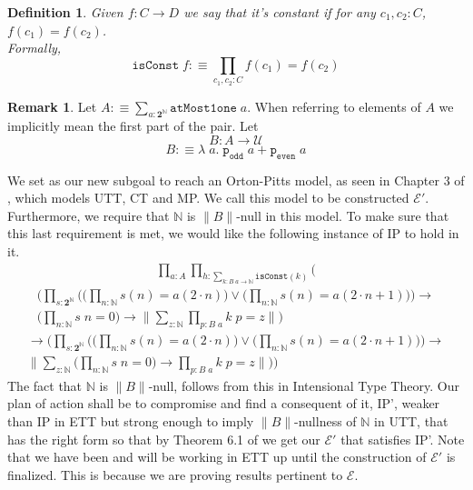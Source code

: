 \documentclass[12pt]{report}
\newtheorem{defn}[thm]{Definition}
\theoremstyle{definition}
\newtheorem{rem}[thm]{Remark}
\begin{document}
\begin{defn}
Given $f : C \rightarrow D$ we say that it's constant if for any $c_1,c_2 : C$, $f(c_1) = f(c_2)$.\\
Formally,
$$\mathtt{isConst}\; f :\equiv \prod_{c_1,c_2 : C}f(c_1) = f(c_2)$$
\end{defn}
\begin{rem}\label{AandB}
Let $A :\equiv \sum_{a: \mathbf{2}^\mathbb{N}}\mathtt{atMost1one}\;a$. 
When referring to elements of $A$ we implicitly mean the first part of the pair. 
Let
$$B : A \rightarrow \mathcal{U}$$
$$B :\equiv \lambda\; a.\; \mathtt{p_{odd}}\; a + \mathtt{p_{even}}\; a$$
\end{rem}
We set as our new subgoal to reach an Orton-Pitts model, as seen in Chapter 3 of \cite{1905.03014}, which models UTT, CT and MP. 
We call this model to be constructed $\mathcal{E}'$. 
Furthermore, we require that $\mathbb{N}$ is $\lVert B \rVert$-null in this model. 
To make sure that this last requirement is met, we would like the following instance of IP to hold in it. 
\begin{multline*}
\prod_{a: A} \prod_{h : \sum_{k : B\;a \rightarrow \mathbb{N}}\mathtt{isConst}(k)} \Bigg( 
\end{multline*}
\begin{multline*}
\bigg( \prod_{s : \mathbf{2}^\mathbb{N}} \Big(\big(\prod_{n : \mathbb{N}} s(n) = a(2 \cdot n)\big) \vee \big(\prod_{n : \mathbb{N}} s(n) = a(2\cdot n +1)\big) \Big) \rightarrow \\
	 \Big(\prod_{n : \mathbb{N}}s\; n = 0 \Big) \rightarrow \Big\lVert \sum_{z : \mathbb{N}}\prod_{p: B\; a}  k\; p = z \Big\rVert \bigg)
\end{multline*}
\begin{multline*}
\rightarrow \bigg( \prod_{s : \mathbf{2}^\mathbb{N}} \Big(\big(\prod_{n : \mathbb{N}} s(n) = a(2 \cdot n)\big) \vee \big(\prod_{n : \mathbb{N}} s(n) = a(2\cdot n +1)\big) \Big) \rightarrow \\
	  \Big\lVert \sum_{z : \mathbb{N}} \Big(\prod_{n : \mathbb{N}}s\; n = 0 \Big) \rightarrow \prod_{p : B\; a} k\; p = z \Big\rVert \bigg) \Bigg)
\end{multline*}
The fact that $\mathbb{N}$ is $\lVert B \rVert$-null, follows from this in Intensional Type Theory. 
Our plan of action shall be to compromise and find a consequent of it, IP', weaker than IP in ETT but strong enough to imply $\lVert B \rVert$-nullness of $\mathbb{N}$ in UTT, that has the right form so that by Theorem 6.1 of \cite{1905.03014} we get our $\mathcal{E}'$ that satisfies IP'. 
Note that we have been and will be working in ETT up until the construction of $\mathcal{E}'$ is finalized. 
This is because we are proving results pertinent to $\mathcal{E}$. 
\end{document}
